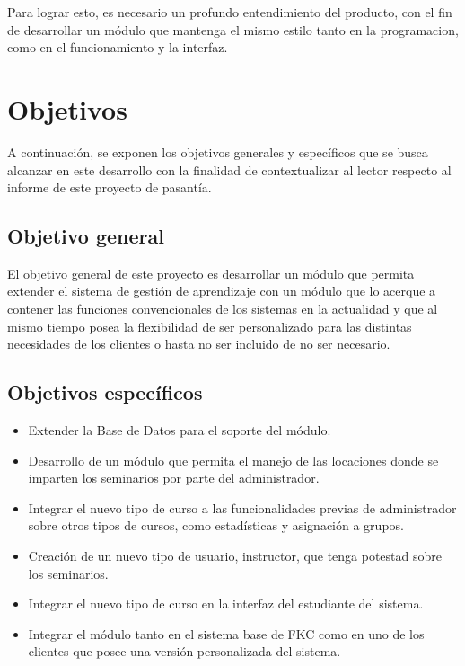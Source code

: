 Para lograr esto, es necesario un profundo entendimiento del producto, con el fin de desarrollar un módulo que mantenga el mismo estilo tanto en la programacion, como en el funcionamiento y la interfaz. 


\section*{Objetivos}
A continuación, se exponen los objetivos generales y específicos que se busca alcanzar en este desarrollo con la finalidad de contextualizar al lector respecto al informe de este proyecto de pasantía.

\subsection*{Objetivo general}
El objetivo general de este proyecto es desarrollar un módulo que permita extender el sistema de gestión de aprendizaje con un módulo que lo acerque a contener las funciones convencionales de los sistemas en la actualidad y que al mismo tiempo posea la flexibilidad de ser personalizado para las distintas necesidades de los clientes o hasta no ser incluido de no ser necesario.

\subsection*{Objetivos específicos}

\begin{itemize}
\item Extender la Base de Datos para el soporte del módulo.
\item Desarrollo de un módulo que permita el manejo de las locaciones donde se imparten los seminarios por parte del administrador.
\item Integrar el nuevo tipo de curso a las funcionalidades previas de administrador sobre otros tipos de cursos, como estadísticas y asignación a grupos.
\item Creación de un nuevo tipo de usuario, instructor, que tenga potestad sobre los seminarios.
\item Integrar el nuevo tipo de curso en la interfaz del estudiante del sistema.
\item Integrar el módulo tanto en el sistema base de FKC como en uno de los clientes que posee una versión personalizada del sistema.
\end{itemize}








